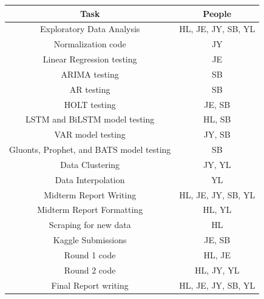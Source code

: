 \documentclass[sigconf,nonacm]{acmart}
\begin{document}
\begin{table}[h!]
    \centering
    \begin{tabular}{|c|c|}
        \hline
         Task & People  \\
         \hline \hline
         Exploratory Data Analysis & HL, JE, JY, SB, YL \\
         \hline
         Normalization code & JY \\
         \hline
         Linear Regression testing & JE \\
         \hline
         ARIMA testing & SB \\
         \hline
         AR testing & SB \\
         \hline
         HOLT testing & JE, SB \\
         \hline
         LSTM and BiLSTM model testing & HL, SB  \\
         \hline
         VAR model testing & JY, SB \\
         \hline
         Gluonts, Prophet, and BATS model testing & SB \\
         \hline
         Data Clustering & JY, YL \\
         \hline
         Data Interpolation & YL \\
         \hline
         Midterm Report Writing & HL, JE, JY, SB, YL \\
         \hline
         Midterm Report Formatting & HL, YL \\
         \hline
         Scraping for new data & HL \\
         \hline
         Kaggle Submissions & JE, SB \\
         \hline
         Round 1 code & HL, JE \\
         \hline
         Round 2 code & HL, JY, YL \\
         \hline
         Final Report writing & HL, JE, JY, SB, YL \\
         \hline
    \end{tabular}
\end{table}




\end{document}
